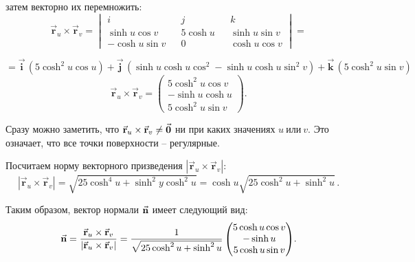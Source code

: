 \documentclass[12pt,a4paper]{article}
\newcommand{\boldVec}[1]{\vec{\mathbf #1}}
\newcommand{\vectorProduct}[2]{\boldVec #1 \times \boldVec #2}
\begin{document}
    \noindent затем векторно их перемножить:
    \[
        \vectorProduct{r _u}{r_v} = 
            \begin{vmatrix}
                i && j && k
                \\
                \sinh u \cos v && 5\cosh u && \sinh u \sin v
                \\
                -\cosh u \sin v && 0 && \cosh u \cos v
            \end{vmatrix}
        =
    \]

    \noindent $ = \boldVec i\,(5 \cosh^2 u \cos u ) + \boldVec j\,(\sinh u \cosh u \cos^2 - \sinh u \cosh u \sin^2 v) + \boldVec k\,(5 \cosh^2 u \sin v) $
    \[
       \vectorProduct{r_u}{r_v} =
        \begin{pmatrix}
            5 \cosh^2 u \cos v
            \\
            -\sinh u \cosh u
            \\
            5 \cosh^2 u \sin v
        \end{pmatrix}\! .
    \]

    Сразу можно заметить, что $ \boldVec r_u \times \boldVec r_v \ne \vec{\textbf 0}$ ни при каких значениях $ u \ \text{или} \ v $. Это означает, что все точки поверхности -- регулярные.

    Посчитаем норму векторного призведения $ | \boldVec r_u \times \boldVec r_v | \colon$ 
    \[
        | \boldVec r_u \times \boldVec r_v | = \sqrt{25 \cosh^4 u + \sinh^2 y \cosh^2 u} = \cosh u \sqrt { 25 \cosh^2 u + \sinh^2 u }\, . 
    \]

    Таким образом, вектор нормали $ \vec{\textbf n} $ имеет следующий вид: 
    \[
        \vec{\textbf n} = \frac{\boldVec r_u \times \boldVec r_v}{| \boldVec r_u \times \boldVec r_v |} = \frac{1}{\sqrt{25 \cosh^2 u + \sinh^2 u}}
        \begin{pmatrix}
            5 \cosh u \cos v
            \\
            -\sinh u
            \\
            5 \cosh u \sin v
        \end{pmatrix} \! .
    \]
\end{document}
